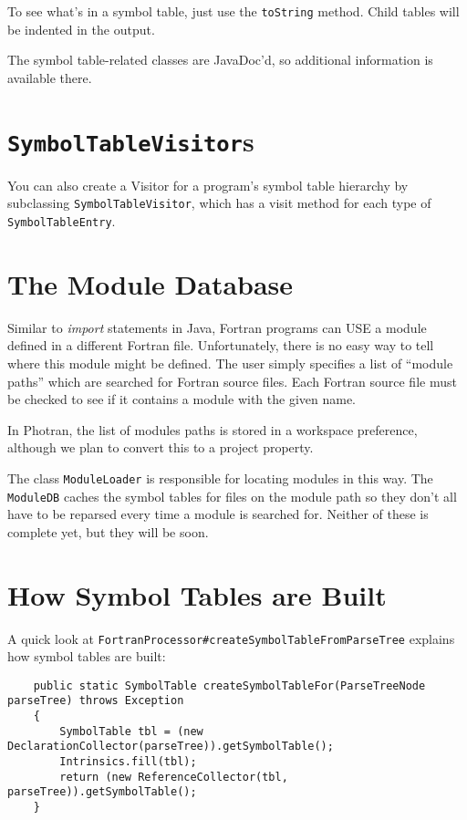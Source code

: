 To see what's in a symbol table, just use the \texttt{toString} method.
Child tables will be indented in the output.

The symbol table-related classes are JavaDoc'd, so additional information
is available there.

\section{\texttt{SymbolTableVisitor}s}

You can also create a Visitor for a program's symbol table hierarchy
by subclassing \texttt{SymbolTableVisitor}, which has a visit method
for each type of \texttt{SymbolTableEntry}.

\section{The Module Database}

Similar to \textit{import} statements in Java, Fortran programs can USE a
module defined in a different Fortran file.  Unfortunately, there is no
easy way to tell where this module might be defined.  The user simply specifies
a list of ``module paths'' which are searched for Fortran source files.
Each Fortran source file must be checked to see if it contains a module
with the given name.

In Photran, the list of modules paths is stored in a workspace preference,
although we plan to convert this to a project property.

The class \texttt{ModuleLoader} is responsible for locating modules in this
way.  The \texttt{ModuleDB} caches the symbol tables for files on the module
path so they don't all have to be reparsed every time a module is searched for.
Neither of these is complete yet, but they will be soon.

\section{How Symbol Tables are Built}

A quick look at \texttt{FortranProcessor\#createSymbolTableFromParseTree}
explains how symbol tables are built:
\begin{verbatim}
    public static SymbolTable createSymbolTableFor(ParseTreeNode parseTree) throws Exception
    {
        SymbolTable tbl = (new DeclarationCollector(parseTree)).getSymbolTable();
        Intrinsics.fill(tbl);
        return (new ReferenceCollector(tbl, parseTree)).getSymbolTable();
    }
\end{verbatim}

